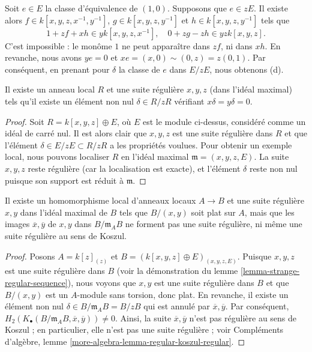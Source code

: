 \medskip\noindent
Soit $e \in E$ la classe d'équivalence de $(1, 0)$.
Supposons que $e \in zE$. Il existe alors $f \in k[x, y, z, x^{-1}, y^{-1}]$,
$g \in k[x, y, z, y^{-1}]$ et $h \in k[x, y, z, y^{-1}]$ tels que
$$
1 + zf + xh \in yk[x, y, z, x^{-1}], \quad
0 + zg - zh \in yzk[x, y, z].
$$
C'est impossible : le monôme $1$ ne peut apparaître dans
$zf$, ni dans $xh$. En revanche, nous avons $ye = 0$ et
$xe = (x, 0) \sim (0, z) = z(0, 1)$. Par conséquent, en prenant pour $\delta$
la classe de $e$ dans $E/zE$, nous obtenons (d).

\begin{lemma}
\label{lemma-strange-regular-sequence}
Il existe un anneau local $R$ et une suite régulière $x, y, z$
(dans l'idéal maximal) tels qu'il existe un élément non nul
$\delta \in R/zR$ vérifiant $x\delta = y\delta = 0$.
\end{lemma}

\begin{proof}
Soit $R = k[x, y, z] \oplus E$, où $E$ est le module ci-dessus, considéré
comme un idéal de carré nul. Il est alors clair que $x, y, z$ est une suite régulière
dans $R$ et que l'élément $\delta \in E/zE \subset R/zR$
a les propriétés voulues. Pour obtenir un exemple local,
nous pouvons localiser $R$ en l'idéal maximal $\mathfrak m = (x, y, z, E)$.
La suite $x, y, z$ reste régulière (car la localisation est
exacte), et l'élément $\delta$ reste non nul puisque son support est réduit
à $\mathfrak m$.
\end{proof}

\begin{lemma}
\label{lemma-base-change-regular-sequence}
Il existe un homomorphisme local d'anneaux locaux $A \to B$
et une suite régulière $x, y$ dans l'idéal maximal de $B$ tels que
$B/(x, y)$ soit plat sur $A$, mais que les images
$\overline{x}, \overline{y}$ de $x, y$ dans $B/\mathfrak m_AB$ ne
forment pas une suite régulière, ni même une suite régulière au sens de Koszul.
\end{lemma}

\begin{proof}
Posons $A = k[z]_{(z)}$ et $B = (k[x, y, z] \oplus E)_{(x, y, z, E)}$.
Puisque $x, y, z$ est une suite régulière dans $B$ (voir la démonstration du
lemme \ref{lemma-strange-regular-sequence}),
nous voyons que $x, y$ est une suite régulière dans $B$ et que
$B/(x, y)$ est un $A$-module sans torsion, donc plat.
En revanche, il existe un élément non nul
$\delta \in B/\mathfrak m_AB = B/zB$ qui est annulé
par $\overline{x}, \overline{y}$. Par conséquent,
$H_2(K_\bullet(B/\mathfrak m_AB, \overline{x}, \overline{y})) \not = 0$.
Ainsi, la suite $\overline{x}, \overline{y}$ n'est pas régulière au sens de Koszul ; en particulier,
elle n'est pas une suite régulière ; voir
Compléments d'algèbre, lemme \ref{more-algebra-lemma-regular-koszul-regular}.
\end{proof}





